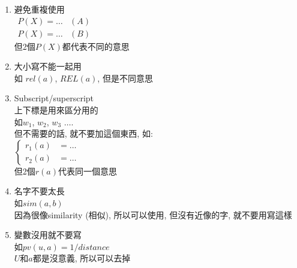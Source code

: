 \begin{enumerate}
  \item
  {
    避免重複使用\\
    $
      \begin{array}{ll}
            P(X) = \ldots & (A)\\
            P(X) = \ldots & (B)
      \end{array}
    $\\
    但2個$ P(X) $都代表不同的意思
  } %

  \item
  {
    大小寫不能一起用\\
    如 $ rel (a) $, $ REL(a) $, 但是不同意思
  } %

  \item
  {
    Subscript/superscript\\
    上下標是用來區分用的\\
    如$ w_{1} $, $ w_{2} $, $ w_{3} $ $ \ldots $.\\

    但不需要的話, 就不要加這個東西, 如:\\
    $
      \left\{
        \begin{array}{ll}
          r_{1}(a) & = \ldots\\
          r_{2}(a) & = \ldots
      	\end{array}
      \right.
    $\\
    但2個$ r(a) $代表同一個意思
  } %

  \item
  {
    名字不要太長\\
    如$ sim(a,b) $\\
    因為很像similarity (相似), 所以可以使用, 但沒有近像的字, 就不要用寫這樣
  } %

  \item
  {
    變數沒用就不要寫\\
    如$ pv(u,a) = 1 / distance $\\
    $U$和$a$都是沒意義, 所以可以去掉
  } %
\end{enumerate}

\EndChapter
